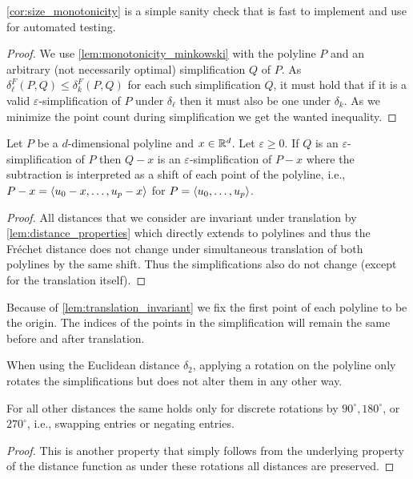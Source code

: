 \cref{cor:size_monotonicity} is a simple sanity check that is fast to implement and use for automated testing. 

\begin{proof}
	We use \cref{lem:monotonicity_minkowski} with the polyline \(P\) and an arbitrary (not necessarily optimal) simplification \(Q\) of \(P\). As \(\delta_\ell^F(P, Q) \leq \delta_k^F(P, Q)\) for each such simplification \(Q\), it must hold that if it is a valid \(\varepsilon\)-simplification of \(P\) under \(\delta_\ell\) then it must also be one under \(\delta_k\). As we minimize the point count during simplification we get the wanted inequality.
\end{proof}

\begin{lemma}\label{lem:translation_invariant}
	Let \(P\) be a \(d\)-dimensional polyline and \(x \in \mathbb{R}^d\). Let \(\varepsilon \geq 0\). If \(Q\) is an \(\varepsilon\)-simplification of \(P\) then \(Q-x\) is an \(\varepsilon\)-simplification of \(P-x\) where the subtraction is interpreted as a shift of each point of the polyline, i.e., \(P-x = \left\langle u_0 - x, \dots, u_p - x\right\rangle\) for \(P = \left\langle u_0,\dots, u_p\right\rangle\).
\end{lemma}

\begin{proof}
	All distances that we consider are invariant under translation by \cref{lem:distance_properties} which directly extends to polylines and thus the Fréchet distance does not change under simultaneous translation of both polylines by the same shift. Thus the simplifications also do not change (except for the translation itself). 
\end{proof}

Because of \cref{lem:translation_invariant} we fix the first point of each polyline to be the origin. The indices of the points in the simplification will remain the same before and after translation. 

\begin{corollary}\label{cor:rot_inv}
  When using the Euclidean distance \(\delta_2\), applying a rotation on the polyline only rotates the simplifications but does not alter them in any other way.

	For all other distances the same holds only for discrete rotations by \(90^\circ, 180^\circ\), or \(270^\circ\), i.e., swapping entries or negating entries.
\end{corollary}

\begin{proof}
  This is another property that simply follows from the underlying property of the distance function as under these rotations all distances are preserved. 
\end{proof}

